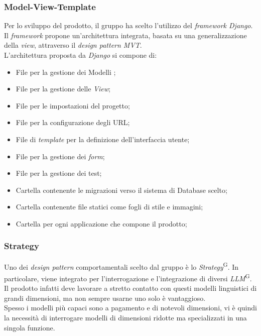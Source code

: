 \documentclass[5pt]{article}
\begin{document}
			\subsubsection{Model-View-Template}
			Per lo sviluppo del prodotto, il gruppo ha scelto l'utilizzo del \textit{framework Django}. Il \textit{framework} propone un'architettura integrata,
			basata su una generalizzazione della \textit{view}, attraverso il \textit{design pattern MVT}. \\
			L'architettura proposta da \textit{Django} si compone di:
			\begin{itemize}
			\item File per la gestione dei Modelli ;
			\item File per la gestione delle \textit{View};
			\item File per le impostazioni del progetto;
			\item File per la configurazione degli URL;
			\item File di \textit{template} per la definizione dell'interfaccia utente;
			\item File per la gestione dei \textit{form}; 
			\item File per la gestione dei test;
			\item Cartella contenente le migrazioni verso il sistema di Database scelto;
			\item Cartella contenente file statici come fogli di stile e immagini;
			\item Cartella per ogni applicazione che compone il prodotto;
			\end{itemize}

		\subsubsection{Strategy}
			Uno dei \textit{design pattern} comportamentali scelto dal gruppo è lo \textit{Strategy}\textsuperscript{G}. 
			In particolare, viene integrato per l'interrogazione e l'integrazione di diversi \textit{LLM}\textsuperscript{G}. 
			Il prodotto infatti deve lavorare a stretto contatto con questi modelli linguistici di grandi dimensioni, ma non sempre usarne uno solo è vantaggioso.  \\
			
			Spesso i modelli più capaci sono a pagamento e di notevoli dimensioni, vi è quindi la necessità di interrogare modelli di dimensioni ridotte ma specializzati in una singola funzione. \\
			
\end{document}
